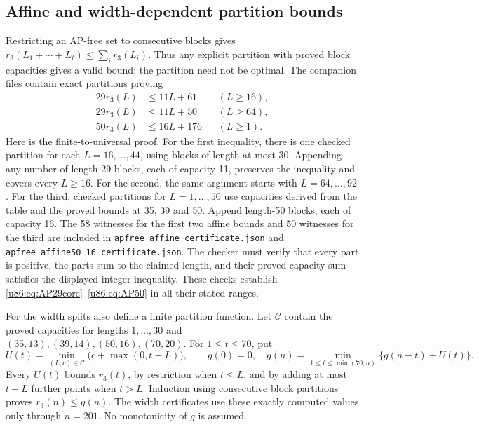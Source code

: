 \documentclass[11pt,a4paper]{article}
\theoremstyle{remark}
\begin{document}
\subsection{Affine and width-dependent partition bounds}\label{u86:sec:APaffine}
Restricting an AP-free set to consecutive blocks gives
$r_3(L_1+\cdots+L_t)\le\sum_i r_3(L_i)$. Thus any explicit partition
with proved block capacities gives a valid bound; the partition need
not be optimal. The companion files contain exact partitions proving
\begin{align}
 29r_3(L)&\le11L+61 &&(L\ge16),\label{u86:eq:AP29core}\\
 29r_3(L)&\le11L+50 &&(L\ge64),\label{u86:eq:AP29whole}\\
 50r_3(L)&\le16L+176 &&(L\ge1).\label{u86:eq:AP50}
\end{align}
Here is the finite-to-universal proof. For the first inequality, there
is one checked partition for each $L=16,\ldots,44$, using blocks of
length at most 30. Appending any number of length-29 blocks, each of
capacity 11, preserves the inequality and covers every $L\ge16$.
For the second, the same argument starts with $L=64,\ldots,92$.
For the third, checked partitions for $L=1,\ldots,50$ use capacities
derived from the table and the proved bounds at 35, 39 and 50. Append
length-50 blocks, each of capacity 16. The 58 witnesses for the first two affine bounds
and 50 witnesses for the third are included in
\texttt{apfree\_affine\_certificate.json} and
\texttt{apfree\_affine50\_16\_certificate.json}. The checker must verify
that every part is positive, the parts sum to the claimed length,
and their proved capacity sum satisfies the displayed integer inequality.
These checks establish \eqref{u86:eq:AP29core}--\eqref{u86:eq:AP50} in all their
stated ranges.

For the width splits also define a finite partition function. Let
$\mathcal C$ contain the proved capacities for lengths $1,\ldots,30$
and $(35,13),(39,14),(50,16),(70,20)$. For $1\le t\le70$, put
\[
 U(t)=\min_{(L,c)\in\mathcal C}\bigl(c+\max(0,t-L)\bigr),\qquad
 g(0)=0,\quad
 g(n)=\min_{1\le t\le\min(70,n)}\{g(n-t)+U(t)\}.
\]
Every $U(t)$ bounds $r_3(t)$, by restriction when $t\le L$, and by
adding at most $t-L$ further points when $t>L$. Induction using
consecutive block partitions proves $r_3(n)\le g(n)$. The width
certificates use these exactly computed values only through $n=201$.
No monotonicity of $g$ is assumed.
\end{document}
